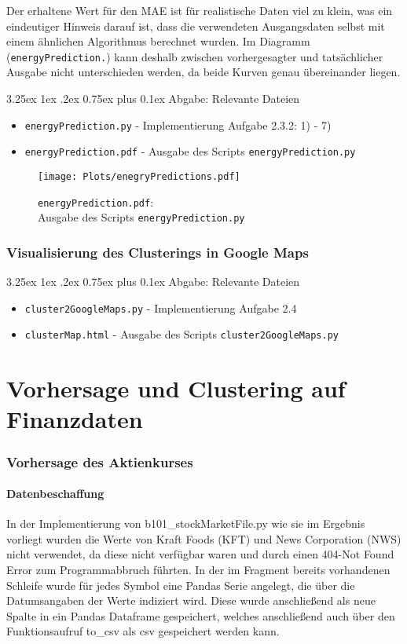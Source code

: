 \documentclass[12pt,a4paper]{scrartcl}
\makeatletter
\renewcommand\subparagraph{\@startsection{subparagraph}{5}{\parindent}%
    {3.25ex \@plus1ex \@minus .2ex}%
    {0.75ex plus 0.1ex}%
    {\normalfont\normalsize\bfseries}}
\makeatother
\begin{document}
Der erhaltene Wert f\"ur den MAE ist f\"ur realistische Daten viel zu klein, was ein eindeutiger Hinweis darauf ist, dass die verwendeten Ausgangsdaten selbst mit einem \"ahnlichen Algorithmus berechnet wurden. 
Im Diagramm (\lstinline{energyPrediction.}) kann deshalb zwischen vorhergesagter und tats\"achlicher Ausgabe nicht unterschieden werden, da beide Kurven genau \"ubereinander liegen. 

\subparagraph{Abgabe: Relevante Dateien}
\begin{itemize}
\item \lstinline{energyPrediction.py} - Implementierung Aufgabe 2.3.2: 1) - 7)
\item \lstinline{energyPrediction.pdf} - Ausgabe des Scripts \lstinline{energyPrediction.py}
\end{itemize}

\begin{figure}[!h]
\texttt{[image: Plots/enegryPredictions.pdf]}
\caption{\lstinline{energyPrediction.pdf}: \\Ausgabe des Scripts \lstinline{energyPrediction.py}}
\end{figure}

\newpage
\section*{Visualisierung des Clusterings in Google Maps}

\subparagraph{Abgabe: Relevante Dateien}
\begin{itemize}
\item \lstinline{cluster2GoogleMaps.py} - Implementierung Aufgabe 2.4
\item \lstinline{clusterMap.html} - Ausgabe des Scripts \lstinline{cluster2GoogleMaps.py}
\end{itemize}


\part*{Vorhersage und Clustering auf Finanzdaten}

\section*{Vorhersage des Aktienkurses}

\subsection*{Datenbeschaffung}
In der Implementierung von b101\_stockMarketFile.py wie sie im Ergebnis vorliegt wurden die Werte von Kraft Foods (KFT) und News Corporation (NWS) nicht verwendet, da diese  nicht verfügbar waren und durch einen 404-Not Found Error zum Programmabbruch führten. \newline In der im Fragment bereits vorhandenen Schleife wurde f\"ur jedes Symbol eine Pandas Serie angelegt, die \"uber die Datumsangaben der Werte indiziert wird. Diese wurde anschließend als neue Spalte in ein Pandas Dataframe gespeichert, welches anschließend auch über den Funktionsaufruf to\_csv als csv gespeichert werden kann. 
\end{document}
